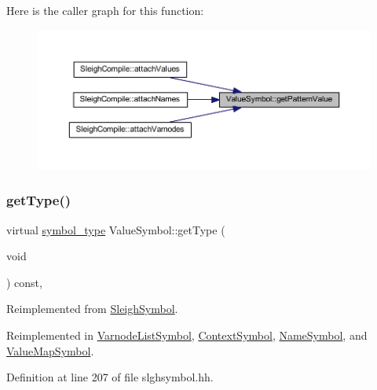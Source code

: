 Here is the caller graph for this function\+:
\nopagebreak
\begin{figure}[H]
\begin{center}
\leavevmode
\includegraphics[width=350pt]{class_value_symbol_a449457fadde51b9fe2c3a8d3a76966c9_icgraph}
\end{center}
\end{figure}
\mbox{\label{class_value_symbol_aa134aca647315ca414f6e4e4a246c9ae}} 
\subsubsection{\texorpdfstring{getType()}{getType()}}
{\footnotesize\ttfamily virtual \mbox{\hyperlink{class_sleigh_symbol_aba70f7f332fd63488c5ec4bd7807db41}{symbol\+\_\+type}} Value\+Symbol\+::get\+Type (\begin{DoxyParamCaption}\item[{void}]{ }\end{DoxyParamCaption}) const\hspace{0.3cm}{\ttfamily [inline]}, {\ttfamily [virtual]}}



Reimplemented from \mbox{\hyperlink{class_sleigh_symbol_a2f6e5903e461084c29f95ea024883950}{Sleigh\+Symbol}}.



Reimplemented in \mbox{\hyperlink{class_varnode_list_symbol_a2b543f4f683e29a4e044726051173897}{Varnode\+List\+Symbol}}, \mbox{\hyperlink{class_context_symbol_ab732b095055fe2b48f4ffccdce790f60}{Context\+Symbol}}, \mbox{\hyperlink{class_name_symbol_a348f7c9857b32717e9ac62c231108686}{Name\+Symbol}}, and \mbox{\hyperlink{class_value_map_symbol_a5a24c6e3381760dad97f55c929de81f3}{Value\+Map\+Symbol}}.



Definition at line 207 of file slghsymbol.\+hh.

